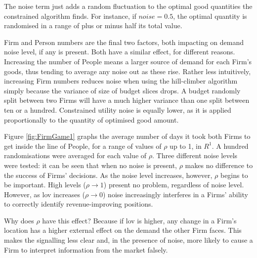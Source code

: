 The noise term just adds a random fluctuation to the optimal good quantities the constrained algorithm finds. For instance, if $noise=0.5$, the optimal quantity is randomised in a range of plus or minus half its total value.

Firm and Person numbers are the final two factors, both impacting on demand noise level, if any is present. Both have a similar effect, for different reasons. Increasing the number of People means a larger source of demand for each Firm's goods, thus tending to average any noise out as these rise. Rather less intuitively, increasing Firm numbers reduces noise when using the hill-climber algorithm simply because the variance of size of budget slices drops. A budget randomly split between two Firms will have a much higher variance than one split between ten or a hundred. Constrained utility noise is equally lower, as it is applied proportionally to the quantity of optimised good amount.

Figure \ref{fig:FirmGame1} graphs the average number of days it took both Firms to get inside the line of People, for a range of values of $\rho$ up to 1, in $R^1$. A hundred randomisations were averaged for each value of $\rho$. Three different noise levels were tested: it can be seen that when no noise is present, $\rho$ makes no difference to the success of Firms' decisions. As the noise level increases, however, $\rho$ begins to be important. High levels ($\rho \rightarrow 1$) present no problem, regardless of noise level. However, as \gls{lov} increases ($\rho \rightarrow 0$) noise increasingly interferes in a Firms' ability to correctly identify revenue-improving positions.

Why does $\rho$ have this effect? Because if \gls{lov} is higher, any change in a Firm's location has a higher external effect on the demand the other Firm faces. This makes the signalling less clear and, in the presence of noise, more likely to cause a Firm to interpret information from the market falsely.
